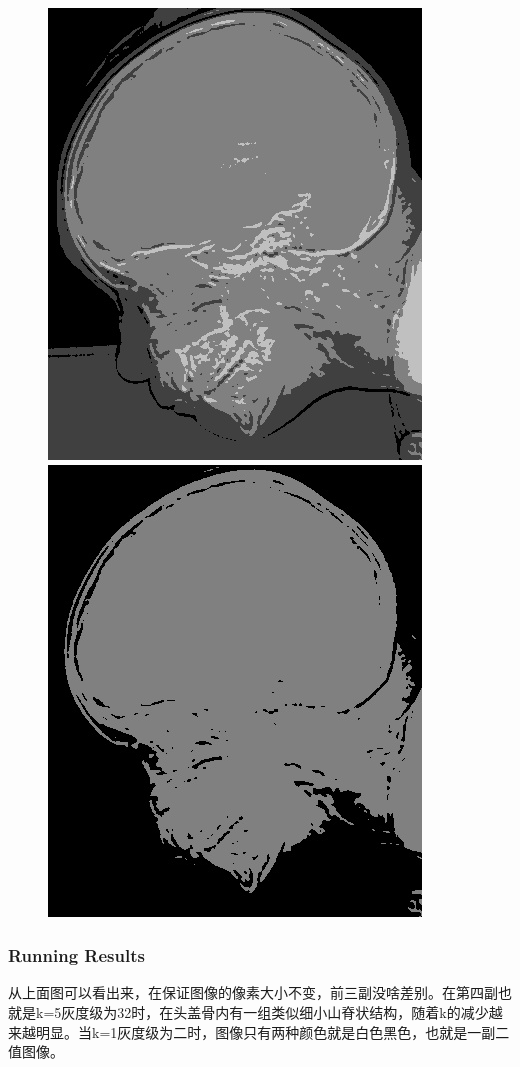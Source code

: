 \documentclass[notheorems,serif,table,compress]{beamer}  %
\begin{document}
\begin{frame}
\begin{figure}
\begin{minipage}[t]{0.4\linewidth}
        \end{minipage}
        \begin{minipage}[t]{0.4\linewidth}
        \centering
        \includegraphics[width=0.8\linewidth]{k=2.jpg} 
        \end{minipage}
        \begin{minipage}[t]{0.4\linewidth}
        \centering
        \includegraphics[width=0.8\linewidth]{k=1.jpg} 
        \end{minipage}
       

    \end{figure}
\end{frame}
\begin{frame}
\frametitle{Running Results}
  从上面图可以看出来，在保证图像的像素大小不变，前三副没啥差别。在第四副也就是k=5灰度级为32时，在头盖骨内有一组类似细小山脊状结构，随着k的减少越来越明显。当k=1灰度级为二时，图像只有两种颜色就是白色黑色，也就是一副二值图像。
\end{frame}
\end{document}
